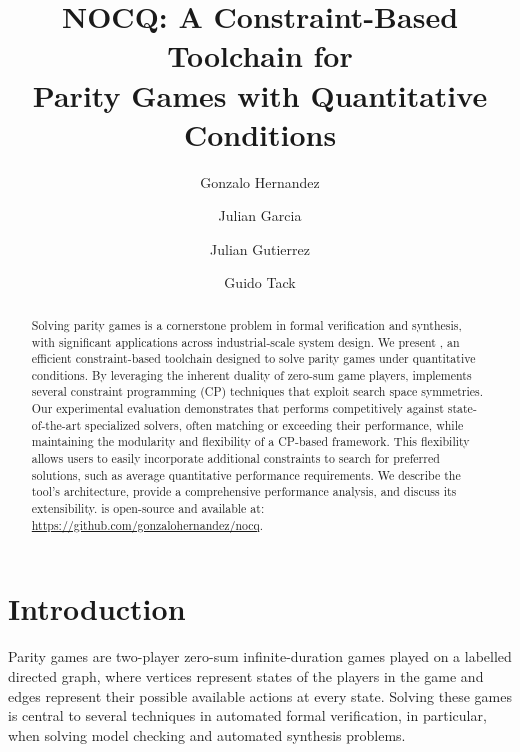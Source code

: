 \documentclass[a4paper,UKenglish,cleveref, autoref, thm-restate, anonymous]{lipics-v2021}
\title{NOCQ: A Constraint-Based Toolchain for\\Parity Games with Quantitative Conditions} %
\author{Gonzalo Hernandez}{Monash University \and Universidad de Nariño}{gonzalo.hernandez@monash.edu\footnote{Also reachable at \texttt{gonzalo.hernandez@udenar.edu.co}}}{}{}
\author{Julian Garcia}{Monash University}{julian.garcia@monash.edu}{}{}
\author{Julian Gutierrez}{University of Sussex}{J.Gutierrez@sussex.ac.uk}{}{}
\author{Guido Tack}{Monash University \and OPTIMA ARC ITTC}{guido.tack@monash.edu}{}{}
\begin{document}
\maketitle

\begin{abstract}
Solving parity games is a cornerstone problem in formal verification and synthesis, with significant applications across industrial-scale system design. We present \nocq, an efficient constraint-based toolchain designed to solve parity games under quantitative conditions. By leveraging the inherent duality of zero-sum game players, \nocq implements several constraint programming (CP) techniques that exploit search space symmetries. Our experimental evaluation demonstrates that \nocq performs competitively against state-of-the-art specialized solvers, often matching or exceeding their performance, while maintaining the modularity and flexibility of a CP-based framework. This flexibility allows users to easily incorporate additional constraints to search for preferred solutions, such as average quantitative performance requirements. We describe the tool's architecture, provide a comprehensive performance analysis, and discuss its extensibility. \nocq is open-source and available at: \url{https://github.com/gonzalohernandez/nocq}.

\end{abstract}

\section{Introduction}

Parity games are two-player zero-sum infinite-duration games played on a labelled directed graph, where vertices represent states of the players in the game and edges represent their possible available actions at every state. 
Solving these games is central to several techniques in automated formal verification, in particular, when solving model checking and automated synthesis problems.
\end{document}
